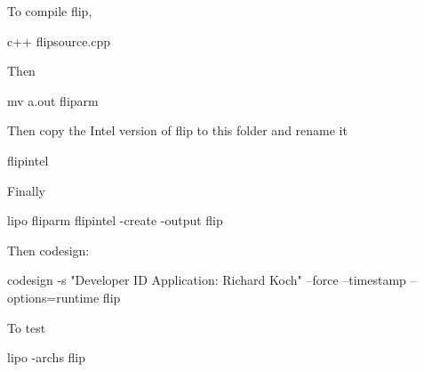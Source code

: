To compile flip,

	c++ flipsource.cpp
	
Then

	mv a.out fliparm
	
Then copy the Intel version of flip to this folder and rename it

	flipintel
	
Finally

	lipo fliparm flipintel -create -output flip
	
Then codesign:

	codesign -s "Developer ID Application: Richard Koch" --force --timestamp --options=runtime flip
	
To test

	lipo -archs flip
	
